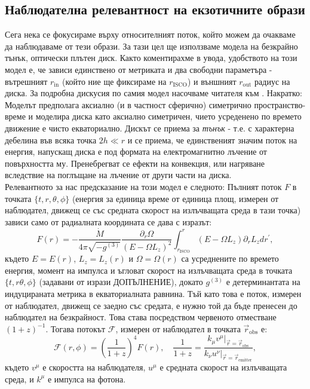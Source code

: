 \subsection{Наблюдателна релевантност на екзотичните образи}

Сега нека се фокусираме върху относителният поток, който можем да очакваме да наблюдаваме от тези образи. За тази цел ще използваме модела на безкрайно тънък, оптически плътен диск. Както коментирахме в увода, удобството на този модел е, че зависи единствено от метриката и два свободни параметъра - вътрешният $r_\text{in}$ (който ние ще фиксираме на $r_\text{ISCO}$) и външният $r_\text{out}$ радиус на диска. За подробна дискусия по самия модел насочваме читателя към \cite{Page1973}. Накратко:\\

Моделът предполага аксиално (и в частност сферично) симетрично пространство-време и моделира диска като аксиално симетричен, чието усреденено по времето движение е чисто екваториално. Дискът се приема за \emph{тънък} - т.е. с характерна дебелина във всяка точка $2h \ll r$ и се приема, че единственият значим поток на енергия, напускащ диска е под формата на електромагнитно лъчение от повърхността му. Пренебрегват се ефекти на конвекция, или нагряване вследствие на поглъщане на лъчение от други части на диска.\\

Релевантното за нас предсказание на този модел е следното: Пълният поток $F$ в точката $\{t,r,\theta,\phi\}$ (енергия за единица време от единица площ, измерен от наблюдател, движещ се със средната скорост на излъчващата среда в тази точка) зависи само от радиалната координата се дава с изразът:
\begin{equation}
	F(r) = - \frac{\dot{M}}{4\pi\sqrt{-g^{(3)}}}\frac{\partial_r\Omega}{\left(E - \Omega L_z\right)^2}\int_{r_\text{ISCO}}^r \left(E - \Omega L_z\right)\partial_rL_zdr^\prime,
\end{equation}
където $E = E(r)$, $L_z = L_z(r)$ и $\Omega = \Omega(r)$ са усреднените по времето енергия, момент на импулса и ъгловат скорост на излъчващата среда в точката $\{t,r\theta,\phi\}$ (задавани от изрази ДОПЪЛНЕНИЕ), докато $g^{(3)}$ е детерминантата на индуцираната метрика в екваториалната равнина. Тъй като това е поток, измерен от наблюдател, движещ се заедно със средата, е нужно той да бъде пренесен до наблюдател на безкрайност. Това става посредством червеното отместване $(1 + z)^{-1}$. Тогава потокът $\mathcal{F}$, измерен от наблюдател в точката $\vec{r}_{\text{obs}}$ е:
\begin{equation}
	\mathcal{F}(r,\phi) = \left(\frac{1}{1+z} \right)^4 F(r),\quad \frac{1}{1 + z} = \frac{k_\mu v^\mu\vert_{\vec{r} = \vec{r}_\text{obs}}}{k_\nu u^\nu\vert_{\vec{r} = \vec{r}_\text{emitter}}},
\end{equation}
където $v^\mu$ е скоростта на наблюдателя, $u^\mu$ е средната скорост на излъчващата среда, и $k^\mu$ е импулса на фотона.\\

